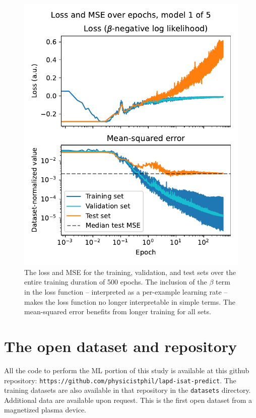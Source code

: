 \begin{figure}
	\includegraphics[width=\textwidth]{figures/beta-NLL_loss-mse.pdf}
	\caption[size=12]{\label{fig:beta-NLL_loss-mse}The loss and MSE for the training, validation, and test sets over the entire training duration of 500 epochs. The inclusion of the $\beta$ term in the loss function -- interpreted as a per-example learning rate -- makes the loss function no longer interpretable in simple terms. The mean-squared error benefits from longer training for all sets.}
\end{figure}


\section{The open dataset and repository}
All the code to perform the ML portion of this study is available at this github repository: \texttt{https://github.com/physicistphil/lapd-isat-predict}. The training datasets are also available in that repository in the \texttt{datasets} directory. Additional data are available upon request. This is the first open dataset from a magnetized plasma device.

